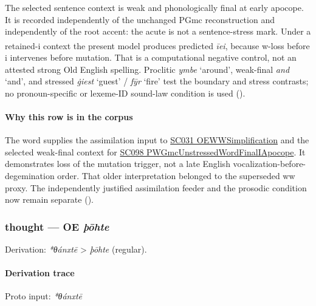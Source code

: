 \documentclass[
  british,
  a4paper,
]{article}
\providecommand{\Pred}[1]{\textsuperscript{\dag}\emph{#1}}
\begin{document}
The selected sentence context is weak and phonologically final at early
apocope. It is recorded independently of the unchanged PGmc
reconstruction and independently of the root accent: the acute is not a
sentence-stress mark. Under a retained-i context the present model
produces predicted \Pred{īei}, because w-loss before i intervenes before
mutation. That is a computational negative control, not an attested
strong Old English spelling. Proclitic \emph{ymbe} `around', weak-final
\emph{and} `and', and stressed \emph{ġiest} `guest' / \emph{fȳr} `fire'
test the boundary and stress contrasts; no pronoun-specific or lexeme-ID
sound-law condition is used ().

\paragraph{Why this row is in the
corpus}\label{why-this-row-is-in-the-corpus-1}

The word supplies the assimilation input to
\hyperref[rule-OEWWSimplification]{SC031 OEWWSimplification} and the
selected weak-final context for
\hyperref[rule-PWGmcUnstressedWordFinalIApocope]{SC098
PWGmcUnstressedWordFinalIApocope}. It demonstrates loss of the mutation
trigger, not a late English vocalization-before-degemination order. That
older interpretation belonged to the superseded ww proxy. The
independently justified assimilation feeder and the prosodic condition
now remain separate ().

\subsubsection{\texorpdfstring{thought --- OE
\emph{þōhte}}{thought --- OE þōhte}}\label{thought-oe-uxfeux14dhte}

Derivation: \emph{*θánxtē} \textgreater{} \emph{þōhte} (regular).

\paragraph{Derivation trace}\label{derivation-trace-80}

Proto input: \emph{*θánxtē}

\begingroup
\setlength{\fboxsep}{6pt}
\end{document}
